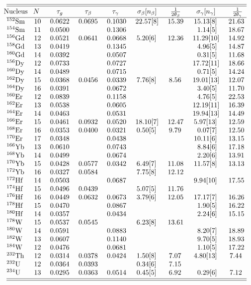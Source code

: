          $$\vbox{\tabskip=0pt \offinterlineskip
         \halign to\hsize{\strut#\tabskip=1em plus2em
         &\hfil#&\hfil#&\hfil#&\hfil#&\hfil#&\hfil#&\hfil#&\hfil#
         \tabskip=0pt\cr
         \noalign{\hrule}
         \noalign{\vskip 2pt}
         \noalign{\hrule}
         \noalign{\vskip 2pt}
         \omit\hidewidth Nucleus\hidewidth
         &\omit\hidewidth $N$ \hidewidth
         &\omit\hidewidth ${\tau}_g$\hidewidth
         &\omit\hidewidth ${\tau}_{\beta}$\hidewidth
         &\omit\hidewidth ${\tau}_{\gamma}$ \hidewidth
         &\omit\hidewidth ${\sigma}_{\beta}[n_{\beta}]$\hidewidth
         &\omit\hidewidth $1\over 2{\theta}_{\beta}$\hidewidth
         &\omit\hidewidth ${\sigma}_{\gamma}[n_{\gamma}]$\hidewidth
         &\omit\hidewidth $1\over 2{\theta}_{\gamma}$\hidewidth \cr
         \noalign{\hrule}
$^{152}{\rm Sm}$&10&0.0622&0.0695&0.1030&22.57[8]&15.39&15.13[8] &21.63\cr
$^{154}{\rm Sm}$&11&0.0500&      &0.1306&        &     &1.14[5]  &18.67\cr
$^{156}{\rm Gd}$&12&0.0521&0.0641&0.0668&5.20[6] &12.36&11.29[10]&14.92\cr
$^{158}{\rm Gd}$&13&0.0419&      &0.1345&        &     &4.96[5]  &14.87\cr
$^{160}{\rm Gd}$&14&0.0392&      &0.0507&        &     &0.31[5]  &11.68\cr
$^{156}{\rm Dy}$&12&0.0733&      &0.0727&        &     &17.72[11]&18.66\cr
$^{160}{\rm Dy}$&14&0.0489&      &0.0715&        &     &0.71[5]  &14.24\cr
$^{162}{\rm Dy}$&15&0.0368&0.0456&0.0339&7.76[8] &8.56 &19.01[13]&12.07\cr
$^{164}{\rm Dy}$&16&0.0391&      &0.0672&        &     &3.40[5]  &11.70\cr
$^{160}{\rm Er}$&12&0.0839&      &0.1158&        &     &4.76[5]  &22.53\cr
$^{162}{\rm Er}$&13&0.0538&      &0.0605&        &     &12.19[11]&16.39\cr
$^{164}{\rm Er}$&14&0.0463&      &0.0531&        &     &19.94[13]&14.49\cr
$^{166}{\rm Er}$&15&0.0461&0.0932&0.0520&18.10[7]&12.47&5.97[13] &12.59\cr
$^{168}{\rm Er}$&16&0.0353&0.0400&0.0321&0.50[5] &9.79 &0.07[7]  &12.50\cr
$^{170}{\rm Er}$&17&0.0348&      &0.0438&        &     &10.11[6] &13.15\cr
$^{166}{\rm Yb}$&13&0.0610&      &0.0743&        &     &8.84[6]  &17.18\cr
$^{168}{\rm Yb}$&14&0.0499&      &0.0674&        &     &2.20[6]  &13.91\cr
$^{170}{\rm Yb}$&15&0.0428&0.0577&0.0342&6.49[7] &11.08&11.57[8] &13.13\cr
$^{172}{\rm Yb}$&16&0.0327&0.0584&      &7.75[8] &12.12&         &     \cr
$^{172}{\rm Hf}$&14&0.0503&      &0.0687&        &     &9.94[10] &17.55\cr
$^{174}{\rm Hf}$&15&0.0496&0.0439&      &5.07[5] &11.76&         &     \cr
$^{176}{\rm Hf}$&16&0.0449&0.0632&0.0673&3.79[6] &12.05&17.17[7] &16.26\cr
$^{178}{\rm Hf}$&15&0.0470&      &0.0867&        &     &1.90[5]  &16.22\cr
$^{180}{\rm Hf}$&14&0.0357&      &0.0434&        &     &2.24[6]  &15.15\cr
$^{178}{\rm W }$&15&0.0537&0.0545&      &6.23[8] &13.61&         &     \cr
$^{180}{\rm W }$&14&0.0591&      &0.0883&        &     &8.20[7]  &18.89\cr
$^{182}{\rm W }$&13&0.0607&      &0.1140&        &     &9.70[5]  &18.93\cr
$^{184}{\rm W }$&12&0.0476&      &0.0681&        &     &1.10[5]  &17.22\cr
$^{232}{\rm Th}$&12&0.0314&0.0378&0.0424&1.50[8] &7.07 &4.80[13] &7.44 \cr
$^{232}{\rm U }$&12&0.0364&0.0393&      &0.34[6] &7.15 &         &     \cr
$^{234}{\rm U }$&13&0.0295&0.0363&0.0514&0.45[5] &6.92 &0.29[6]  &7.12 \cr
         \noalign{\vskip 2pt}
         \noalign{\hrule}
         \noalign{\vskip 2pt}
         \noalign{\hrule}}}$$


